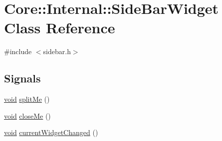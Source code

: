 \hypertarget{class_core_1_1_internal_1_1_side_bar_widget}{\section{\-Core\-:\-:\-Internal\-:\-:\-Side\-Bar\-Widget \-Class \-Reference}
\label{class_core_1_1_internal_1_1_side_bar_widget}
}


{\ttfamily \#include $<$sidebar.\-h$>$}

\subsection*{\-Signals}
\begin{DoxyCompactItemize}
\item 
\hyperlink{group___u_a_v_objects_plugin_ga444cf2ff3f0ecbe028adce838d373f5c}{void} \hyperlink{group___core_plugin_ga0254fa3f1c629d33aed5e8c989463158}{split\-Me} ()
\item 
\hyperlink{group___u_a_v_objects_plugin_ga444cf2ff3f0ecbe028adce838d373f5c}{void} \hyperlink{group___core_plugin_ga51339bee6cb7c6970cf94c1ed2a4148c}{close\-Me} ()
\item 
\hyperlink{group___u_a_v_objects_plugin_ga444cf2ff3f0ecbe028adce838d373f5c}{void} \hyperlink{group___core_plugin_ga0a5688916a02e0e519306197f4c84fed}{current\-Widget\-Changed} ()
\end{DoxyCompactItemize}
